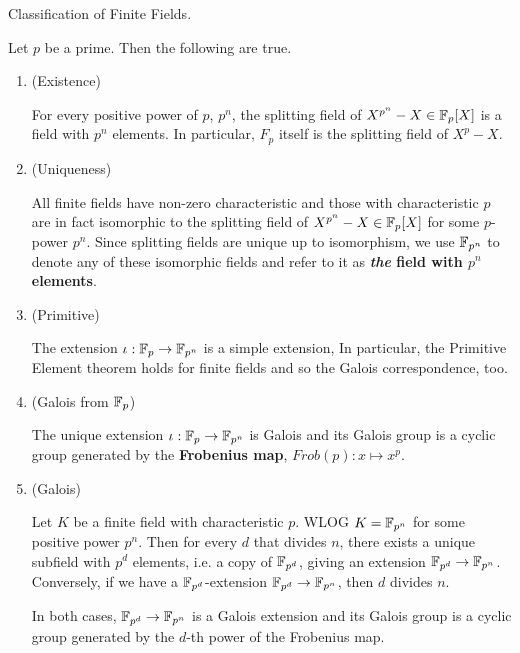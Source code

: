 \documentclass[../book.tex]{subfiles}
\begin{document}
\begin{thm} Classification of Finite Fields.
    
    Let $p$ be a prime. Then the following are true. 
    \begin{enumerate}
        \item (Existence)
        
        For every positive power of $p$, $p^n$, 
        the splitting field of $X^{p^n} - X \in \mathbb{F}_p[X]$
        is a field with $p^n$ elements.
        In particular, $F_p$ itself is the splitting field of $X^p - X$. 
        \item (Uniqueness)
        
        All finite fields have non-zero characteristic and 
        those with characteristic $p$ are in fact isomorphic to
        the splitting field of $X^{p^n} - X \in \mathbb{F}_p[X]$ for some $p$-power $p^n$. 
        Since splitting fields are unique up to isomorphism,
        we use $\mathbb{F}_{p^n}$ to denote any of these isomorphic fields
        and refer to it as \textbf{\emph{the} field with $p^n$ elements}. 
        \item (Primitive)
        
        The extension $\iota : \mathbb{F}_p \to \mathbb{F}_{p^n}$ is a simple extension,
        In particular, the Primitive Element theorem holds for finite fields
        and so the Galois correspondence, too. 
        \item (Galois from $\mathbb{F}_p$)
        
        The unique extension $\iota : \mathbb{F}_p \to \mathbb{F}_{p^n}$ is Galois and 
        its Galois group is a cyclic group generated by 
        the \textbf{Frobenius map}, $Frob(p) : x \mapsto x^p$. 
        \item (Galois)
        
        Let $K$ be a finite field with characteristic $p$. 
        WLOG $K = \mathbb{F}_{p^n}$ for some positive power $p^n$. 
        Then for every $d$ that divides $n$, 
        there exists a unique subfield with $p^d$ elements, 
        i.e. a copy of $\mathbb{F}_{p^d}$, giving an extension $\mathbb{F}_{p^d} \to \mathbb{F}_{p^n}$.
        Conversely, if we have a $\mathbb{F}_{p^d}$-extension $\mathbb{F}_{p^d} \to \mathbb{F}_{p^n}$,
        then $d$ divides $n$. 
        
        In both cases, 
        $\mathbb{F}_{p^d} \to \mathbb{F}_{p^n}$ is a Galois extension and 
        its Galois group is a cyclic group generated by 
        the $d$-th power of the Frobenius map. 
    \end{enumerate}
    
\end{thm}
\end{document}
